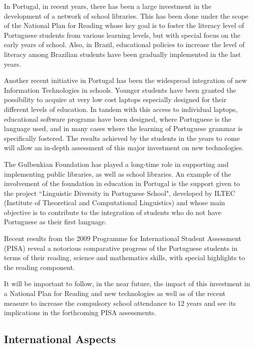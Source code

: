 \begin{multicols}{2}
In Portugal, in recent years, there has been a large investment in the development of a network of school libraries. This has been done under the scope of the National Plan for Reading whose key goal is to foster the literacy level of Portuguese students from various learning levels, but with special focus on the early years of school. Also, in Brazil, educational policies to increase the level of literacy among Brazilian students have been gradually implemented in the last years.

Another recent initiative in Portugal has been the widespread integration of new Information Technologies in schools. Younger students have been granted the possibility to acquire at very low cost laptops especially designed for their different levels of education. In tandem with this access to individual laptops, educational software programs have been designed, where Portuguese is the language used, and in many cases where the learning of Portuguese grammar is specifically fostered. The results achieved by the students in the years to come will allow an in-depth assessment of this major investment on new technologies.


The Gulbenkian Foundation has played a long-time role in supporting and implementing public libraries, as well as school libraries. An example of the involvement of the foundation in education in Portugal is the support given to the project “Linguistic Diversity in Portuguese School"\cite{gulbenkian2}, developed by ILTEC (Institute of Theoretical and Computational Linguistics) and whose main objective is to contribute to the integration of students who do not have Portuguese as their first language.

Recent results from the 2009 Programme for International Student Assessment (PISA) reveal a notorious comparative progress of the Portuguese students in terms of their reading, science and mathematics skills, with special highlights to the reading component. 

It will be important to follow, in the near future, the impact of this investment in a National Plan for Reading and new technologies as well as of the recent measure to increase the compulsory school attendance to 12 years and see its implications in the forthcoming PISA assessments.

\subsection{International Aspects}


\end{multicols}

